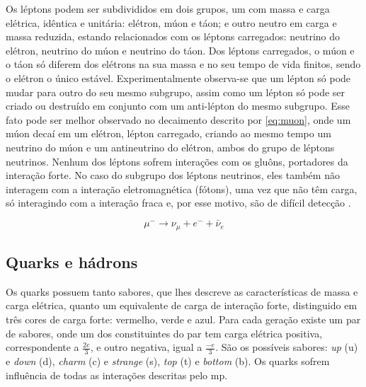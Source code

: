 Os léptons podem ser subdivididos em dois grupos, 
um com massa e carga elétrica, idêntica e unitária: elétron, múon e táon; 
e outro neutro em carga e massa reduzida, estando relacionados com os léptons
carregados: neutrino do elétron, neutrino do múon e neutrino do táon. Dos
léptons carregados, o múon e o táon só diferem dos elétrons na sua massa e no
seu tempo de vida finitos, sendo o elétron o único estável.
Experimentalmente observa-se que um lépton só pode mudar para outro do seu mesmo
subgrupo, assim como um lépton só pode ser criado ou destruído em conjunto com
um anti-lépton do mesmo subgrupo. Esse fato pode ser melhor observado no
decaimento descrito por \ref{eq:muon}, onde um múon decaí em um
elétron, lépton carregado, criando ao mesmo tempo um neutrino do múon e um
antineutrino do elétron, ambos do grupo de léptons neutrinos.
Nenhum dos léptons sofrem interações com os gluôns, portadores da interação forte.
No caso do subgrupo dos léptons neutrinos, eles também não interagem com a
interação eletromagnética (fótons), 
uma vez que não têm carga, só interagindo com a interação fraca e, por esse motivo,
são de difícil detecção \cite{Intro_Nuclear,Intro_Standard}.

\begin{equation} \label{eq:muon}
\mu^{-} \rightarrow \nu_{\mu} + e^- + \bar{\nu}_{e}
\end{equation}

\subsection{Quarks e hádrons}
\label{ssec:quarks}

Os quarks possuem tanto sabores, que lhes descreve as características de massa e
carga elétrica, quanto um equivalente de carga de interação
forte, distinguido em três cores de carga forte: vermelho, verde e azul. 
Para cada geração existe um par de sabores, onde um dos constituintes do par tem
carga elétrica positiva, correspondente a $\frac{2e}{3}$,
e outro negativa, igual a $\frac{-e}{3}$. São os possíveis sabores: \emph{up}
(u) e \emph{down} (d), \emph{charm} (c) e \emph{strange} (s), \emph{top} (t) e
\emph{bottom} (b). Os quarks sofrem influência de todas as interações descritas
pelo \gls{mp}.


